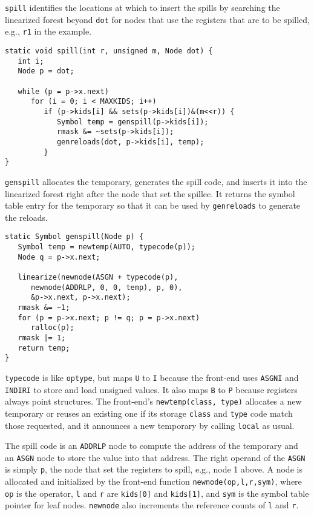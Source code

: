 \verb|spill| identifies the locations at which
to insert the spills by searching the linearized forest beyond \verb|dot|
for nodes that use the registers that are to be spilled, e.g.,
\verb|r1| in the example.
\begin{verbatim}
static void spill(int r, unsigned m, Node dot) {
   int i;
   Node p = dot;

   while (p = p->x.next)
      for (i = 0; i < MAXKIDS; i++)
         if (p->kids[i] && sets(p->kids[i])&(m<<r)) {
            Symbol temp = genspill(p->kids[i]);
            rmask &= ~sets(p->kids[i]);
            genreloads(dot, p->kids[i], temp);
         }
}
\end{verbatim}
\verb|genspill| allocates the temporary,
generates the spill code, and inserts it into the linearized forest
right after the node that set the spillee.
It returns the symbol table entry for the temporary
so that it can be used by \verb|genreloads| to generate the reloads.
\begin{verbatim}
static Symbol genspill(Node p) {
   Symbol temp = newtemp(AUTO, typecode(p));
   Node q = p->x.next;

   linearize(newnode(ASGN + typecode(p),
      newnode(ADDRLP, 0, 0, temp), p, 0),
      &p->x.next, p->x.next);
   rmask &= ~1;
   for (p = p->x.next; p != q; p = p->x.next)
      ralloc(p);
   rmask |= 1;
   return temp;
}
\end{verbatim}
\verb|typecode| is like \verb|optype|, but maps \verb|U| to \verb|I|
because the front-end uses \verb|ASGNI| and \verb|INDIRI|
to store and load unsigned values. It also maps \verb|B| to
\verb|P| because registers always point structures.
The front-end's \verb|newtemp(class, type)|
allocates a new temporary or reuses an existing one if
its storage \verb|class| and \verb|type| code match those requested,
and it announces a new temporary by calling \verb|local| as usual.

The spill code is an \verb|ADDRLP| node to compute the
address of the temporary and an \verb|ASGN| node to store the value
into that address. The right operand of the \verb|ASGN| is simply
\verb|p|, the node that set the registers to spill, e.g.,
node 1 above.
A node is allocated and initialized by the front-end function
\verb|newnode(op,l,r,sym)|, where
\verb|op| is the operator, \verb|l| and \verb|r|
are \verb|kids[0]| and \verb|kids[1]|, and \verb|sym| is the symbol
table pointer for leaf nodes. \verb|newnode| also increments
the reference counts of \verb|l| and \verb|r|.


